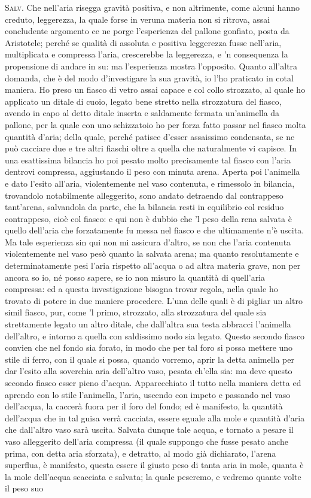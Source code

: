 \documentclass[11pt,twoside,openany]{book}
\newcommand{\speaker}[1]{\textcolor{rubric}{\textsc{#1}}\space}
\begin{document}
\speaker{Salv.} Che nell'aria risegga gravità positiva, e non altrimente, come alcuni hanno creduto, leggerezza, la quale forse in veruna materia non si ritrova, assai concludente argomento ce ne porge l'esperienza del pallone gonfiato, posta da Aristotele; perché se qualità di assoluta e positiva leggerezza fusse nell'aria, multiplicata e compressa l'aria, crescerebbe la leggerezza, e 'n consequenza la propensione di andare in su: ma l'esperienza mostra l'opposito. Quanto all'altra domanda, che è del modo d'investigare la sua gravità, io l'ho praticato in cotal maniera. Ho preso un fiasco di vetro assai capace e col collo strozzato, al quale ho applicato un ditale di cuoio, legato bene stretto nella strozzatura del fiasco, avendo in capo al detto ditale inserta e saldamente fermata un'animella da pallone, per la quale con uno schizzatoio ho per forza fatto passar nel fiasco molta quantità d'aria; della quale, perché patisce d'esser assaissimo condensata, se ne può cacciare due e tre altri fiaschi oltre a quella che naturalmente vi capisce. In una esattissima bilancia ho poi pesato molto precisamente tal fiasco con l'aria dentrovi compressa, aggiustando il peso con minuta arena. Aperta poi l'animella e dato l'esito all'aria, violentemente nel vaso contenuta, e rimessolo in bilancia, trovandolo notabilmente alleggerito, sono andato detraendo dal contrappeso tant'arena, salvandola da parte, che la bilancia resti in equilibrio col residuo contrappeso, cioè col fiasco: e qui non è dubbio che 'l peso della rena salvata è quello dell'aria che forzatamente fu messa nel fiasco e che ultimamente n'è uscita. Ma tale esperienza sin qui non mi assicura d'altro, se non che l'aria contenuta violentemente nel vaso pesò quanto la salvata arena; ma quanto resolutamente e determinatamente pesi l'aria rispetto all'acqua o ad altra materia grave, non per ancora so io, né posso sapere, se io non misuro la quantità di quell'aria compressa: ed a questa investigazione bisogna trovar regola, nella quale ho trovato di potere in due maniere procedere. L'una delle quali è di pigliar un altro simil fiasco, pur, come 'l primo, strozzato, alla strozzatura del quale sia strettamente legato un altro ditale, che dall'altra sua testa abbracci l'animella dell'altro, e intorno a quella con saldissimo nodo sia legato. Questo secondo fiasco convien che nel fondo sia forato, in modo che per tal foro si possa mettere uno stile di ferro, con il quale si possa, quando vorremo, aprir la detta animella per dar l'esito alla soverchia aria dell'altro vaso, pesata ch'ella sia: ma deve questo secondo fiasco esser pieno d'acqua. Apparecchiato il tutto nella maniera detta ed aprendo con lo stile l'animella, l'aria, uscendo con impeto e passando nel vaso dell'acqua, la caccerà fuora per il foro del fondo; ed è manifesto, la quantità dell'acqua che in tal guisa verrà cacciata, essere eguale alla mole e quantità d'aria che dall'altro vaso sarà uscita. Salvata dunque tale acqua, e tornato a pesare il vaso alleggerito dell'aria compressa (il quale suppongo che fusse pesato anche prima, con detta aria sforzata), e detratto, al modo già dichiarato, l'arena superflua, è manifesto, questa essere il giusto peso di tanta aria in mole, quanta è la mole dell'acqua scacciata e salvata; la quale peseremo, e vedremo quante volte il peso suo 
\end{document}
